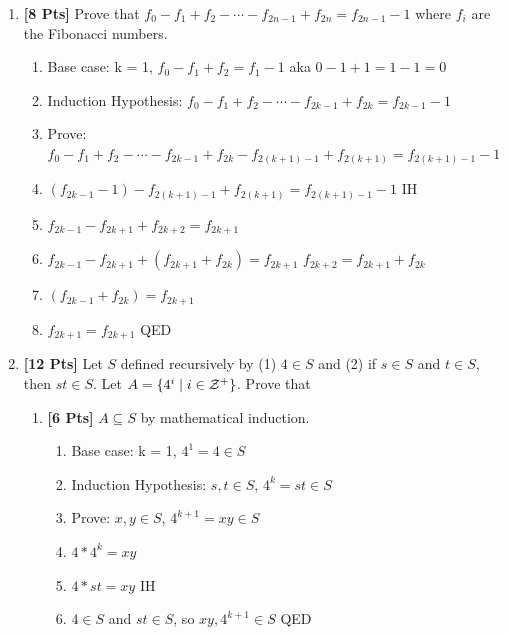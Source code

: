 \documentclass[11pt]{article}
\begin{document}
    \begin{enumerate}

        \item {\bf [8 Pts]} Prove that $f_0 - f_1 + f_2 - \cdots - f_{2n-1} + f_{2n} = f_{2n-1} - 1$ where $f_i$ are the Fibonacci numbers.
        \begin{enumerate}
            \item Base case: k = 1, $f_0 - f_1 + f_2 = f_1 - 1$ aka $0 - 1 + 1 = 1 - 1 = 0$
            \item Induction Hypothesis: $f_0 - f_1 + f_2 - \cdots - f_{2k-1} + f_{2k} = f_{2k-1} - 1$
            \item Prove: $f_0 - f_1 + f_2 - \cdots - f_{2k-1} + f_{2k} - f_{2(k + 1)-1} + f_{2(k + 1)} = f_{2(k + 1)-1} - 1$
            \item $(f_{2k-1} - 1) - f_{2(k + 1)-1} + f_{2(k + 1)} = f_{2(k + 1)-1} - 1$ \null\hfill IH
            \item $f_{2k-1} - f_{2k + 1} + f_{2k + 2} = f_{2k + 1}$
            \item $f_{2k-1} - f_{2k + 1} + (f_{2k + 1} +f_{2k}) = f_{2k + 1}$ \null\hfill $f_{2k + 2} = f_{2k + 1} +f_{2k}$
            \item $(f_{2k-1} + f_{2k}) = f_{2k + 1}$
            \item $f_{2k + 1} = f_{2k + 1}$ \null\hfill QED
        \end{enumerate}
        \item {\bf [12 Pts]} Let $S$ defined recursively by (1) $4 \in S$ and (2) if $s \in S$ and $t \in S$, then $st \in S$. Let $A = \{4^i \mid i \in {\cal Z}^+\}$. Prove that

        \begin{enumerate}

            \item {\bf [6 Pts]} $A \subseteq S$ by mathematical induction.
            \begin{enumerate}
                \item Base case: k = 1, $4^1 = 4 \in S$
                \item Induction Hypothesis: $s, t \in S$, $4^k = st \in S$
                \item Prove: $x, y \in S$, $4^{k+1} = xy \in S$
                \item $4*4^k = xy$
                \item $4*st = xy$ \null\hfill IH
                \item $4 \in S$ and $st \in S$, so $xy, 4^{k+1} \in S$ \null\hfill QED
            \end{enumerate}


\end{enumerate}
\end{enumerate}
\end{document}

